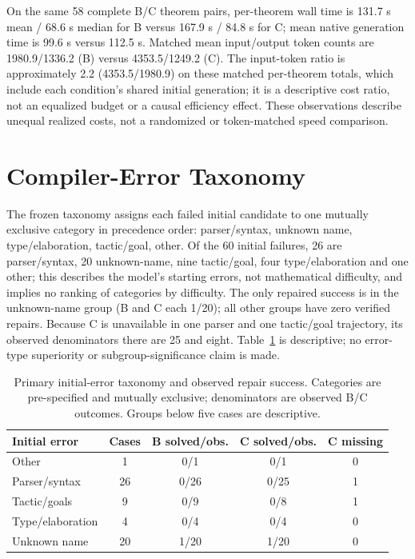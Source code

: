 \documentclass[runningheads,a4paper]{llncs}
\begin{document}
On the same 58 complete B/C theorem pairs, per-theorem wall time is
131.7 s mean / 68.6 s median for B versus 167.9 s / 84.8 s for C;
mean native generation time is 99.6 s versus 112.5 s. Matched mean
input/output token counts are 1980.9/1336.2 (B) versus 4353.5/1249.2
(C). The input-token ratio is approximately 2.2 (4353.5/1980.9) on these matched per-theorem totals, which include each condition's shared initial generation; it is a descriptive cost ratio, not an equalized budget or a causal efficiency effect. These observations describe unequal realized costs, not a
randomized or token-matched speed comparison.

\section{Compiler-Error Taxonomy}
The frozen taxonomy assigns each failed initial candidate to one mutually
exclusive category in precedence order: parser/syntax, unknown name,
type/elaboration, tactic/goal, other. Of the 60 initial failures, 26 are
parser/syntax, 20 unknown-name, nine tactic/goal, four type/elaboration and one
other; this describes the model's starting errors, not mathematical difficulty,
and implies no ranking of categories by difficulty.
The only repaired success is in the unknown-name group (B and C each 1/20); all
other groups have zero verified repairs. Because C is unavailable in one parser and
one tactic/goal trajectory, its observed denominators there are 25 and eight.
Table~\ref{tab:errors} is descriptive; no
error-type superiority or subgroup-significance claim is made.

\begin{table}[tbp]
\caption{Primary initial-error taxonomy and observed repair success. Categories are
pre-specified and mutually exclusive; denominators are observed B/C outcomes.
Groups below five cases are descriptive.}
\label{tab:errors}
\centering\small
\begin{tabular}{lcccc}
\toprule
Initial error & Cases & B solved/obs. & C solved/obs. & C missing\\
\midrule
Other            & 1  & 0/1  & 0/1  & 0\\
Parser/syntax    & 26 & 0/26 & 0/25 & 1\\
Tactic/goals     & 9  & 0/9  & 0/8  & 1\\
Type/elaboration & 4  & 0/4  & 0/4  & 0\\
Unknown name     & 20 & 1/20 & 1/20 & 0\\
\bottomrule
\end{tabular}
\end{table}
\end{document}
